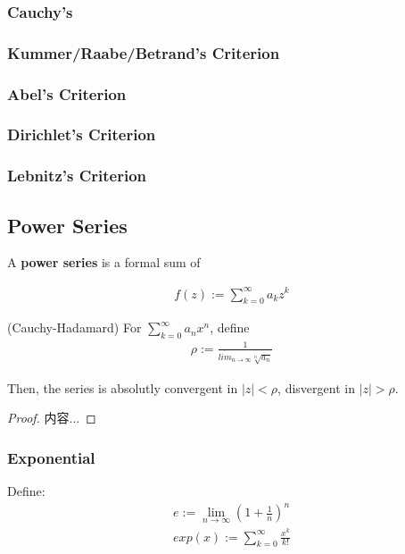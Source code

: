 \documentclass[Total.tex]{subfiles}
\begin{document}
				\subsubsection{Cauchy's }
				
				\subsubsection{Kummer/Raabe/Betrand's Criterion}
				\subsubsection{Abel's Criterion}
				\subsubsection{Dirichlet's Criterion}
				\subsubsection{Lebnitz's Criterion}
			\subsection{Power Series}
				\begin{Def}
					A \textbf{power series} is a formal sum of
					
					\begin{gather*}
						f(z):=\sum_{k=0}^\infty a_k z^k
					\end{gather*}
				\end{Def}
				
				\begin{theorem}
					(Cauchy-Hadamard) For $\sum_{k=0}^\infty a_nx^n$, define
					\begin{gather*}
						\rho:=\frac{1}{\overline{lim}_{n\rightarrow \infty} \sqrt[n]{a_n}}
					\end{gather*}
					
					Then, the series is absolutly convergent in $|z|<\rho$, disvergent in $|z|>\rho$. 
				\end{theorem}
				\begin{proof}
					内容...
				\end{proof}
			\subsubsection{Exponential}
				Define:
				\begin{gather*}
					e:=\lim_{n\rightarrow \infty} (1+\frac{1}{n})^n\\
					exp(x):=\sum_{k=0}^\infty \frac{x^k}{k!}
				\end{gather*}
\end{document}

